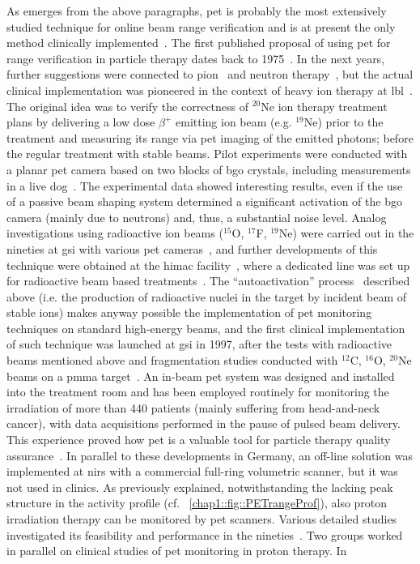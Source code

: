 As emerges from the above paragraphs, \gls{pet} is probably the most extensively studied technique for online beam range verification and is at present the only method clinically implemented~\parencite{Enghardt2004}. The first published proposal of using \gls{pet} for range verification in particle therapy dates back to 1975~\parencite{Bennett1975}. In the next years, further suggestions were connected to pion~\parencite{Goodman1986, Shirato1989} and neutron therapy~\parencite{Vynckier1989}, but the actual clinical implementation was pioneered in the context of heavy ion therapy at \gls{lbl}~\parencite{Llacer1979, Chatterjee1981}. The original idea was to verify the correctness of $^20$Ne ion therapy treatment plans by delivering a low dose $\beta^+$ emitting ion beam (e.g. $^19$Ne) prior to the treatment and measuring its range via \gls{pet} imaging of the emitted photons; before the regular treatment with stable beams. Pilot experiments were conducted with a planar \gls{pet} camera based on two blocks of \gls{bgo} crystals, including measurements in a live dog~\parencite{Llacer1984b}. The experimental data showed interesting results, even if the use of a passive beam shaping system determined a significant activation of the \gls{bgo} camera (mainly due to neutrons) and, thus, a substantial noise level. Analog investigations using radioactive ion beams ($^{15}$O, $^{17}$F, $^{19}$Ne) were carried out in the nineties at \gls{gsi} with various \gls{pet} cameras~\parencite{Pawelke1996}, and further developments of this technique were obtained at the \gls{himac} facility~\parencite{Iseki2004, Kitagawa2006}, where a dedicated line was set up for radioactive beam based treatments~\parencite{Urakabe2001, Kanazawa2002}. The \enquote{autoactivation} process~\parencite{Tobias1971} described above (i.e. the production of radioactive nuclei in the target by incident beam of stable ions) makes anyway possible the implementation of \gls{pet} monitoring techniques on standard high-energy beams, and the first clinical implementation of such  technique was launched at \gls{gsi} in 1997, after the tests with radioactive beams mentioned above and fragmentation studies conducted with $^{12}$C, $^{16}$O, $^{20}$Ne beams on a \gls{pmma} target~\parencite{Enghardt1992}. An in-beam \gls{pet} system was designed and installed into the treatment room and has been employed routinely for monitoring the irradiation of more than 440 patients (mainly suffering from head-and-neck cancer), with data acquisitions performed in the pause of pulsed beam delivery. This experience proved how \gls{pet} is a valuable tool for particle therapy quality assurance~\parencite{Enghardt2004}. In parallel to these developments in Germany, an off-line solution was implemented at \gls{nirs} with a commercial full-ring volumetric scanner, but it was not used in clinics. As previously explained, notwithstanding the lacking peak structure in the activity profile (cf. \figurename~\ref{chap1::fig::PETrangeProf}), also proton irradiation therapy can be monitored by \gls{pet} scanners. Various detailed studies investigated its feasibility and performance in the nineties~\parencite{Litzenberg1992, Paans1993, Oelfke1996, Litzenberg1999}. Two groups worked in parallel on clinical studies of \gls{pet} monitoring in proton therapy. In 